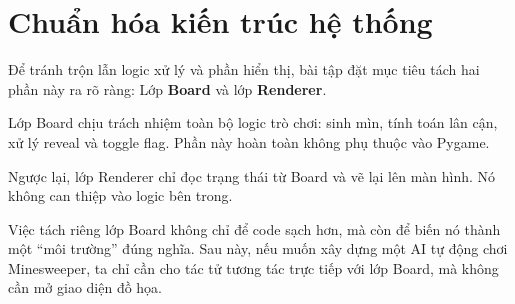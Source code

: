 \section{Chuẩn hóa kiến trúc hệ thống}

Để tránh trộn lẫn logic xử lý và phần hiển thị, bài tập đặt mục tiêu tách hai phần này ra rõ ràng: Lớp \textbf{Board} và lớp \textbf{Renderer}.

Lớp Board chịu trách nhiệm toàn bộ logic trò chơi: sinh mìn, tính toán lân cận, xử lý reveal và toggle flag. Phần này hoàn toàn không phụ thuộc vào Pygame.

Ngược lại, lớp Renderer chỉ đọc trạng thái từ Board và vẽ lại lên màn hình. Nó không can thiệp vào logic bên trong.

Việc tách riêng lớp Board không chỉ để code sạch hơn, mà còn để biến nó thành một “môi trường” đúng nghĩa. Sau này, nếu muốn xây dựng một AI tự động chơi Minesweeper, ta chỉ cần cho tác tử tương tác trực tiếp với lớp Board, mà không cần mở giao diện đồ họa.

